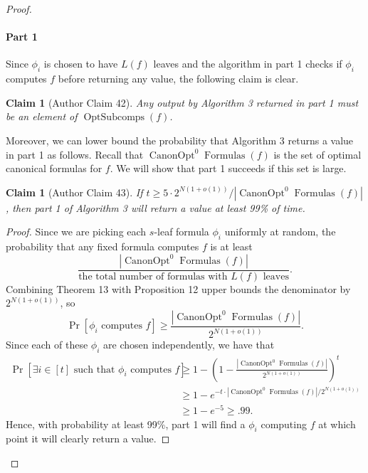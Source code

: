 \documentclass[10pt,a4paper]{article}
\newtheorem{ntclaim}[nttheorem]{Claim}
\newcommand{\Opt}{\operatorname{OptSubcomps}}
\newcommand{\Canon}[1]{\operatorname{CanonOpt}^{#1}\!\operatorname{Formulas}}
\begin{document}
\begin{proof}
\paragraph{Part 1}
Since $\phi_i$ is chosen to have $L(f)$ leaves and the algorithm in part 1 checks if $\phi_i$ computes $f$ before returning any value, the following claim is clear.
\begin{ntclaim}[Author Claim 42]
Any output by Algorithm 3 returned in part 1 must be an element of $\Opt(f)$.
\end{ntclaim}
Moreover, we can lower bound the probability that Algorithm 3 returns a value in part 1 as follows. Recall that $\Canon{0}(f)$ is the set of optimal canonical formulas for $f$. We will show that part 1 succeeds if this set is large.
\begin{ntclaim}[Author Claim 43]
If $t\geq 5\cdot 2^{N(1+o(1))}/|\Canon{0}(f)|$, then part 1 of Algorithm 3 will return a value at least 99\% of time.
\end{ntclaim}
\begin{proof}
Since we are picking each $s$-leaf formula $\phi_i$ uniformly at random, the probability that any fixed formula computes $f$ is at least
\[\frac{|\Canon{0}(f)|}{\text{the total number of formulas with }L(f)\text{ leaves}}.\]
Combining Theorem 13 with Proposition 12 upper bounds the denominator by $2^{N(1+o(1))}$, so
\[\Pr[\phi_i\text{ computes }f]\geq\frac{|\Canon{0}(f)|}{2^{N(1+o(1))}}.\]
Since each of these $\phi_i$ are chosen independently, we have that
\begin{align*}\Pr[\exists i\in[t]\text{ such that }\phi_i\text{ computes }f]&\geq 1-\left(1-\frac{|\Canon{0}(f)|}{2^{N(1+o(1))}}\right)^t\\&\geq 1-e^{-t\cdot|\Canon{0}(f)|/2^{N(1+o(1))}}\\&\geq 1-e^{-5}\geq.99.\end{align*}
Hence, with probability at least 99\%, part 1 will find a $\phi_i$ computing $f$ at which point it will clearly return a value.
\end{proof}

\end{proof}
\end{document}
